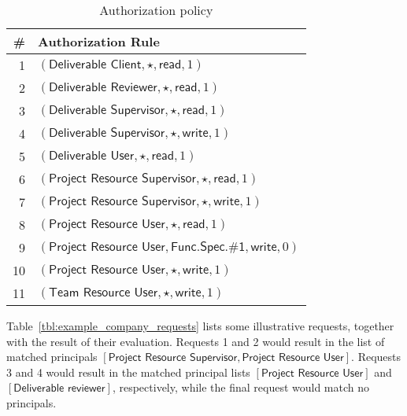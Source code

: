\documentclass{article}
\begin{document}
\begin{table}[!ht]\centering
  {\renewcommand{\arraystretch}{1.25}
  \begin{tabular}{|r|l|}
    \hline
        \bf \# & \bf Authorization Rule \\
    \hline
    \hline
        1 & $(\textsf{Deliverable Client}, \star, \textsf{read}, 1)$ \\
        2 & $(\textsf{Deliverable Reviewer}, \star, \textsf{read}, 1)$ \\
        3 & $(\textsf{Deliverable Supervisor}, \star, \textsf{read}, 1)$ \\
        4 & $(\textsf{Deliverable Supervisor}, \star, \textsf{write}, 1)$ \\
        5 & $(\textsf{Deliverable User}, \star, \textsf{read}, 1)$ \\
        6 & $(\textsf{Project Resource Supervisor}, \star, \textsf{read}, 1)$ \\
        7 & $(\textsf{Project Resource Supervisor}, \star, \textsf{write}, 1)$ \\
        8 & $(\textsf{Project Resource User}, \star, \textsf{read}, 1)$ \\
        9 & $(\textsf{Project Resource User}, \textsf{Func.Spec.\#1}, \textsf{write}, 0)$ \\
        10 & $(\textsf{Project Resource User}, \star, \textsf{write}, 1)$ \\
        11 & $(\textsf{Team Resource User}, \star, \textsf{write}, 1)$ \\
    \hline
  \end{tabular}}
\caption{Authorization policy}\label{tbl:example_company_authorization_policy}
\end{table}

Table~\ref{tbl:example_company_requests} lists some illustrative requests, together with the result of their evaluation.
Requests 1 and 2 would result in the list of matched principals $[\textsf{Project Resource Supervisor}, \textsf{Project Resource User}]$.
Requests 3 and 4 would result in the matched principal lists $[\textsf{Project Resource User}]$ and $[\textsf{Deliverable reviewer}]$, respectively, while the final request would match no principals.
\end{document}
